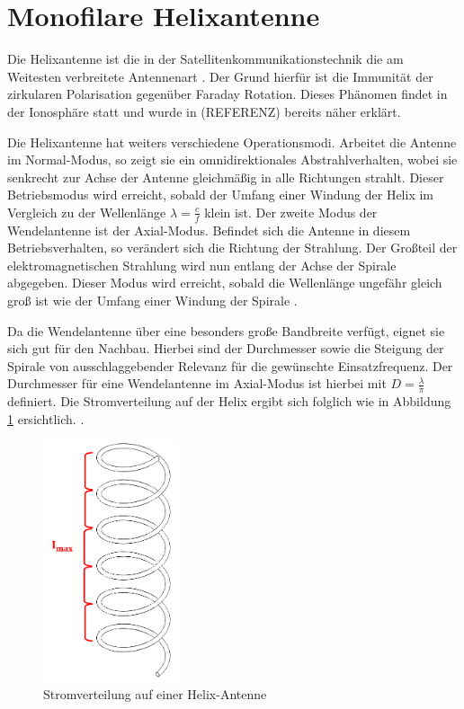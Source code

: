 \section{Monofilare Helixantenne}
Die Helixantenne ist die in der Satellitenkommunikationstechnik die am Weitesten verbreitete Antennenart \cite{HelicalAntennas}. Der Grund hierfür ist die Immunität der zirkularen Polarisation gegenüber Faraday Rotation. Dieses Phänomen findet in der Ionosphäre statt \cite{FaradayRotation} und wurde in (REFERENZ) bereits näher erklärt.

Die Helixantenne hat weiters verschiedene Operationsmodi. Arbeitet die Antenne im Normal-Modus, so zeigt sie ein omnidirektionales Abstrahlverhalten, wobei sie senkrecht zur Achse der Antenne gleichmäßig in alle Richtungen strahlt. Dieser Betriebsmodus wird erreicht, sobald der Umfang einer Windung der Helix im Vergleich zu der Wellenlänge $\lambda=\frac{c}{f}$ klein ist. Der zweite Modus der Wendelantenne ist der Axial-Modus. Befindet sich die Antenne in diesem Betriebsverhalten, so verändert sich die Richtung der Strahlung. Der Großteil der elektromagnetischen Strahlung wird nun entlang der Achse der Spirale abgegeben. Dieser Modus wird erreicht, sobald die Wellenlänge ungefähr gleich groß ist wie der Umfang einer Windung der Spirale \cite{HelicalAntennas}.

Da die Wendelantenne über eine besonders große Bandbreite verfügt, eignet sie sich gut für den Nachbau. Hierbei sind der Durchmesser sowie die Steigung der Spirale von ausschlaggebender Relevanz für die gewünschte Einsatzfrequenz. Der Durchmesser für eine Wendelantenne im Axial-Modus ist hierbei mit $D=\frac{\lambda}{\pi}$ definiert. Die Stromverteilung auf der Helix ergibt sich folglich wie in Abbildung \ref{fig:CrntDis-Helix} ersichtlich. \cite{HelicalAntennas}.

\begin{figure}[H]
	\centering
	\includegraphics[width=4cm]{../ref/Spirale_Doku}
	\caption{Stromverteilung auf einer Helix-Antenne}
	\label{fig:CrntDis-Helix}
\end{figure}

